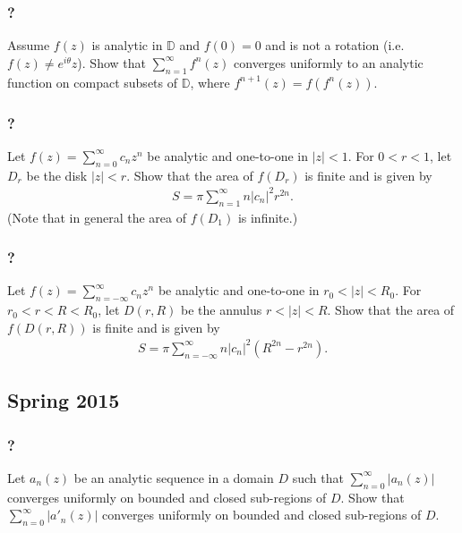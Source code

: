 \hypertarget{section-154}{%
\subsubsection{?}\label{section-154}}

Assume \(f(z)\) is analytic in \({\mathbb D}\) and \(f(0)=0\) and is not
a rotation (i.e.~\(f(z) \neq e^{i \theta} z\)). Show that
\(\displaystyle \sum_{n=1}^\infty f^{n}(z)\) converges uniformly to an
analytic function on compact subsets of \({\mathbb D}\), where
\(f^{n+1}(z) = f(f^{n}(z))\).

\hypertarget{section-155}{%
\subsubsection{?}\label{section-155}}

Let \(f(z) = \sum_{n=0}^\infty c_n z^n\) be analytic and one-to-one in
\(|z| < 1\). For \(0<r<1\), let \(D_r\) be the disk \(|z|<r\). Show that
the area of \(f(D_r)\) is finite and is given by
\begin{align*}S = \pi \sum_{n=1}^\infty n |c_n|^2 r^{2n}.\end{align*}
(Note that in general the area of \(f(D_1)\) is infinite.)

\hypertarget{section-156}{%
\subsubsection{?}\label{section-156}}

Let \(f(z) = \sum_{n= -\infty}^\infty c_n z^n\) be analytic and
one-to-one in \(r_0< |z| < R_0\). For \(r_0<r<R<R_0\), let \(D(r,R)\) be
the annulus \(r<|z|<R\). Show that the area of \(f(D(r,R))\) is finite
and is given by
\begin{align*}S = \pi \sum_{n=- \infty}^\infty n |c_n|^2 (R^{2n} - r^{2n}).\end{align*}

\hypertarget{spring-2015}{%
\subsection{Spring 2015}\label{spring-2015}}

\hypertarget{section-157}{%
\subsubsection{?}\label{section-157}}

Let \(a_n(z)\) be an analytic sequence in a domain \(D\) such that
\(\displaystyle \sum_{n=0}^\infty |a_n(z)|\) converges uniformly on
bounded and closed sub-regions of \(D\). Show that
\(\displaystyle \sum_{n=0}^\infty |a'_n(z)|\) converges uniformly on
bounded and closed sub-regions of \(D\).

